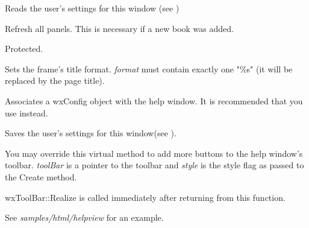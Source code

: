 Reads the user's settings for this window (see )

\label{wxhtmlhelpwindowrefreshlists}


Refresh all panels. This is necessary if a new book was added.

Protected.

\label{wxhtmlhelpwindowsettitleformat}


Sets the frame's title format. {\it format} must contain exactly one "\%s"
(it will be replaced by the page title).

\label{wxhtmlhelpwindowuseconfig}


Associates a wxConfig object with the help window. It is recommended that you use  instead.

\label{wxhtmlhelpwindowwritecustomization}


Saves the user's settings for this window(see ).

\label{wxhtmlhelpwindowaddtoolbarbuttons}


You may override this virtual method to add more buttons to the help window's
toolbar. {\it toolBar} is a pointer to the toolbar and {\it style} is the style
flag as passed to the Create method.

wxToolBar::Realize is called immediately after returning from this function.

See {\it samples/html/helpview} for an example.

\section{}\label{wxhtmlmodalhelp}

